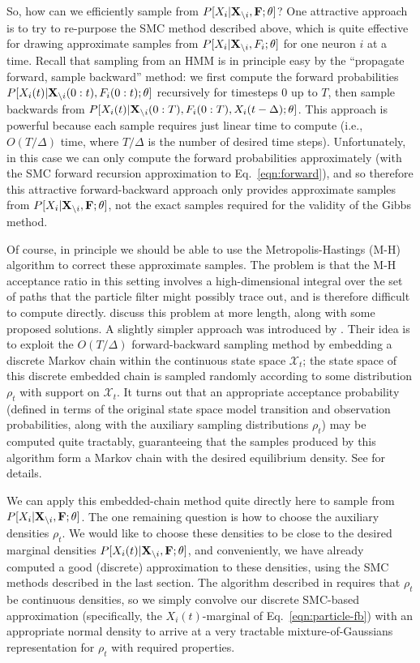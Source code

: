 So, how can we efficiently sample from $P[X_i | {\bf X}_{\backslash i}, {\bf F}; \mathbf{\theta}]$? One attractive approach is to try to re-purpose the SMC method described above, which is quite effective for drawing approximate samples from $P[X_i | {\bf X}_{\backslash i}, F_i; \mathbf{\theta}]$ for one neuron $i$ at a time. Recall that sampling from an HMM is in principle easy by the ``propagate forward, sample backward'' method: we first compute the forward probabilities $P[X_i(t) | {\bf X}_{\backslash i}(0:t), F_i(0:t); \mathbf{\theta}]$ recursively for timesteps $0$ up to $T$, then sample backwards from $P[X_i(t) | {\bf X}_{\backslash i}(0:T), F_i(0:T), X_i(t-\Delta); \mathbf{\theta}]$. This approach is powerful because each sample requires just linear time to compute (i.e., $O(T/\Delta)$ time, where $T/\Delta$ is the number of desired time steps). Unfortunately, in this case we can only compute the forward probabilities approximately (with the SMC forward recursion approximation to Eq.~\eqref{eqn:forward}), and so therefore this attractive forward-backward approach only provides approximate samples from $P[X_i | {\bf X}_{\backslash i}, {\bf F}; \mathbf{\theta}]$, not the exact samples required for the validity of the Gibbs method.

Of course, in principle we should be able to use the Metropolis-Hastings (M-H) algorithm to correct these approximate samples. The problem is that the M-H acceptance ratio in this setting involves a high-dimensional integral over the set of paths that the particle filter might possibly trace out, and is therefore difficult to compute directly. \cite{Andrieu2007} discuss this problem at more length, along with some proposed solutions. A slightly simpler approach was introduced by \cite{NBR03}. Their idea is to exploit the $O(T/\Delta)$ forward-backward sampling method by embedding a discrete Markov chain within the continuous state space $\mathcal{X}_t$; the state space of this discrete embedded chain is sampled randomly according to some distribution $\rho_t$ with support on $\mathcal{X}_t$. It turns out that an appropriate acceptance probability (defined in terms of the original state space model transition and observation probabilities, along with the auxiliary sampling distributions $\rho_t$) may be computed quite tractably, guaranteeing that the samples produced by this algorithm form a Markov chain with the desired equilibrium density. See \cite{NBR03} for details.

We can apply this embedded-chain method quite directly here to sample from $P[X_i | {\bf X}_{\backslash i}, {\bf F}; \mathbf{\theta}]$. The one remaining question is how to choose the auxiliary densities $\rho_t$. We would like to choose these densities to be close to the desired marginal densities $P[X_i(t) | {\bf X}_{\backslash i}, {\bf F}; \mathbf{\theta}]$, and conveniently, we have already computed a good (discrete) approximation to these densities, using the SMC methods described in the last section. The algorithm described in \cite{NBR03} requires that $\rho_t$ be continuous densities, so we simply convolve our discrete SMC-based approximation (specifically, the $X_i(t)$-marginal of Eq.~\eqref{eqn:particle-fb}) with an appropriate normal density to arrive at a very tractable mixture-of-Gaussians representation for $\rho_t$ with required properties.

